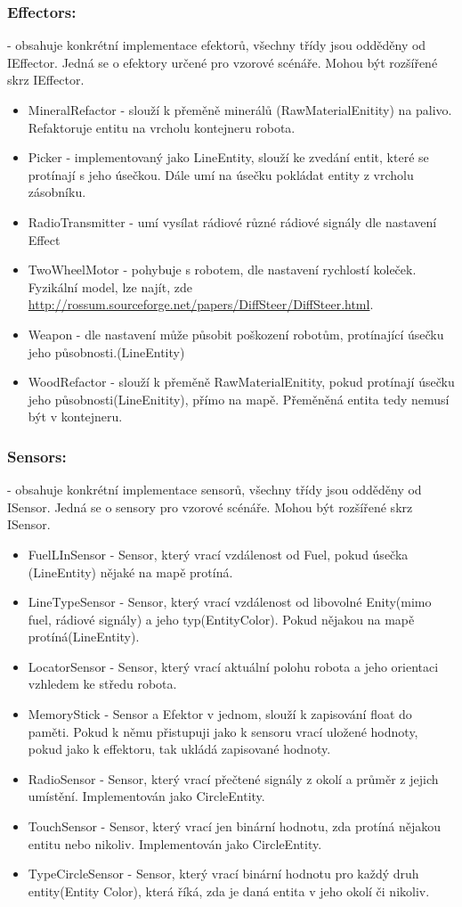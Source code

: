 \documentclass[12pt, oneside]{article}
\begin{document}
\subsubsection{Effectors:}
- obsahuje konkrétní implementace efektorů, všechny třídy jsou odděděny od IEffector. Jedná se o efektory určené pro vzorové scénáře. Mohou být rozšířené skrz IEffector. \\
\begin{itemize}
	\item MineralRefactor - slouží k přeměně minerálů (RawMaterialEnitity) na palivo. Refaktoruje entitu na vrcholu kontejneru robota. 
	\item Picker - implementovaný jako LineEntity, slouží ke zvedání entit, které se protínají s jeho úsečkou. Dále umí na úsečku pokládat entity z vrcholu zásobníku. 
	\item RadioTransmitter - umí vysílat rádiové  různé rádiové signály dle nastavení Effect
	\item TwoWheelMotor - pohybuje s robotem, dle nastavení rychlostí koleček. Fyzikální model, lze najít, zde  \url{http://rossum.sourceforge.net/papers/DiffSteer/DiffSteer.html}. 
	\item Weapon - dle nastavení může působit poškození robotům, protínající úsečku jeho působnosti.(LineEntity) 
	\item WoodRefactor - slouží k přeměně RawMaterialEnitity, pokud protínají úsečku jeho působnosti(LineEnitity), přímo na mapě. Přeměněná entita tedy nemusí být v kontejneru.
\end{itemize}
\subsubsection{Sensors:}
- obsahuje konkrétní implementace sensorů, všechny třídy jsou  odděděny od ISensor. Jedná se o sensory pro vzorové scénáře. Mohou být rozšířené skrz ISensor.
\begin{itemize}
	\item FuelLInSensor - Sensor, který vrací vzdálenost od Fuel, pokud úsečka (LineEntity) nějaké na mapě protíná.
	\item LineTypeSensor - Sensor, který vrací vzdálenost od libovolné Enity(mimo fuel, rádiové signály) a jeho typ(EntityColor). Pokud nějakou na mapě protíná(LineEntity). 
	\item LocatorSensor - Sensor, který vrací aktuální polohu robota a jeho orientaci vzhledem ke středu robota. 
	\item MemoryStick - Sensor a Efektor v jednom, slouží k zapisování float do paměti. Pokud k němu přistupuji jako k sensoru vrací uložené hodnoty, pokud jako k effektoru, tak ukládá zapisované hodnoty. 
	\item RadioSensor - Sensor, který vrací přečtené signály z okolí a průměr z jejich umístění. Implementován jako CircleEntity. 
	\item TouchSensor - Sensor, který vrací jen binární hodnotu, zda protíná nějakou entitu nebo nikoliv. Implementován jako CircleEntity. 
	\item TypeCircleSensor - Sensor, který vrací binární hodnotu pro každý druh entity(Entity Color), která říká, zda je daná entita v jeho okolí či nikoliv.
\end{itemize}
\end{document}
